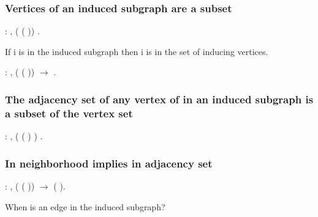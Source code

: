\subsubsection{Vertices of an induced subgraph are a subset}


\begin{coqdoccode}
\coqdocemptyline
\coqdocnoindent
{}  : \coqdockw{\ensuremath{\forall}}  ,  ( (  )) .\coqdoceol
\coqdocemptyline
\end{coqdoccode}
If i is in the induced subgraph then i is in the set of inducing
    vertices.
\begin{coqdoccode}
\coqdocemptyline
\coqdocnoindent
{}  : \coqdockw{\ensuremath{\forall}}   ,   ( (  )) \ensuremath{\rightarrow}   .\coqdoceol
\coqdocemptyline
\end{coqdoccode}
\subsubsection{The adjacency set of any vertex of in an induced subgraph is a subset of the vertex set}


\begin{coqdoccode}
\coqdocemptyline
\coqdocnoindent
{}  : \coqdockw{\ensuremath{\forall}}   ,  ( (  ) ) .\coqdoceol
\coqdocemptyline
\end{coqdoccode}
\subsubsection{In neighborhood implies in adjacency set}


\begin{coqdoccode}
\coqdocemptyline
\coqdocnoindent
{}  : \coqdockw{\ensuremath{\forall}}   ,   ( (  )) \ensuremath{\rightarrow}   (  ).\coqdoceol
\coqdocemptyline
\end{coqdoccode}
When is an edge in the induced subgraph?

